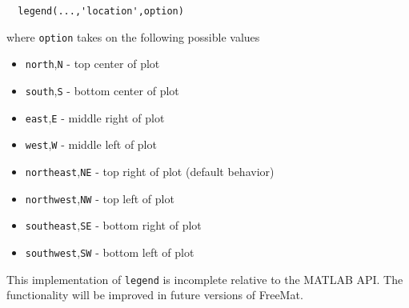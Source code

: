 \begin{verbatim}
  legend(...,'location',option)
\end{verbatim}
where \verb|option| takes on the following possible values
\begin{itemize}
\item  \verb|north|,\verb|N| - top center of plot 

\item  \verb|south|,\verb|S| - bottom center of plot

\item  \verb|east|,\verb|E| - middle right of plot

\item  \verb|west|,\verb|W| - middle left of plot

\item  \verb|northeast|,\verb|NE| - top right of plot (default behavior)

\item  \verb|northwest|,\verb|NW| - top left of plot

\item  \verb|southeast|,\verb|SE| - bottom right of plot

\item  \verb|southwest|,\verb|SW| - bottom left of plot

\end{itemize}
This implementation of \verb|legend| is incomplete relative to the 
MATLAB API.  The functionality will be improved in future versions
of FreeMat.
